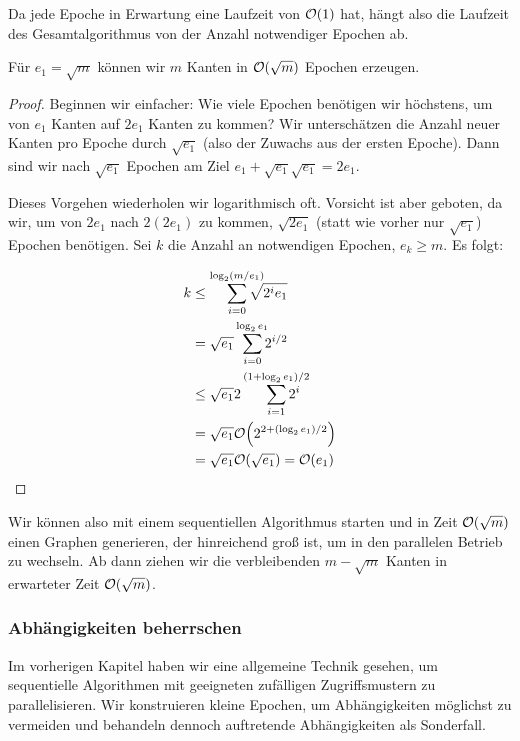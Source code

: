Da jede Epoche in Erwartung eine Laufzeit von $\mathcal{O}\!\left(1\right)$ hat, hängt also die Laufzeit des Gesamtalgorithmus von der Anzahl notwendiger Epochen ab.

\begin{lemma}
    Für $e_1 = \sqrt{m}$ können wir $m$ Kanten in $\mathcal{O}\!\left(\sqrt{m}\right)$ Epochen erzeugen.
\end{lemma}

\begin{proof}
    Beginnen wir einfacher: Wie viele Epochen benötigen wir höchstens, um von $e_1$ Kanten auf $2e_1$ Kanten zu kommen?
    Wir unterschätzen die Anzahl neuer Kanten pro Epoche durch $\sqrt{e_1}$ (also der Zuwachs aus der ersten Epoche).
    Dann sind wir nach $\sqrt{e_1}$ Epochen am Ziel $e_1 + \sqrt{e_1} \sqrt{e_1} = 2 e_1$.

    Dieses Vorgehen wiederholen wir logarithmisch oft.
    Vorsicht ist aber geboten, da wir, um von $2e_1$ nach $2(2e_1)$ zu kommen, $\sqrt{2 e_1}$ (statt wie vorher nur $\sqrt{e_1}$) Epochen benötigen.
    Sei $k$ die Anzahl an notwendigen Epochen, \dh $e_k \ge m$.
    Es folgt:

    \begin{align}
        k & \le \smashoperator[r]{\sum_{i=0}^{\ld(m/e_1)}} \sqrt{2^i e_1}      \\
          & = \sqrt{e_1} \smashoperator[r]{\sum_{i=0}^{\ld e_1}} 2^{i/2}       \\
          & \le \sqrt{e_1} 2 \smashoperator[r]{\sum_{i=1}^{(1+\ld e_1)/2}} 2^i \\
          & = \sqrt{e_1} \Oh{2^{2 + (\ld e_1) / 2}}         \\
          & = \sqrt{e_1} \Oh{\sqrt{e_1}} = \Oh{e_1}
    \end{align}
\end{proof}

Wir können also mit einem sequentiellen Algorithmus starten und in Zeit $\mathcal{O}\!\left(\sqrt m\right)$ einen Graphen generieren, der hinreichend groß ist, um in den parallelen Betrieb zu wechseln.
Ab dann ziehen wir die verbleibenden $m - \sqrt{m}$ Kanten in erwarteter Zeit $\mathcal{O}\!\left(\sqrt m\right)$.

\subsubsection{Abhängigkeiten beherrschen}\label{subsec:ba_sanders}
Im vorherigen Kapitel haben wir eine allgemeine Technik gesehen, um sequentielle Algorithmen mit geeigneten zufälligen Zugriffsmustern zu parallelisieren.
Wir konstruieren kleine Epochen, um Abhängigkeiten möglichst zu vermeiden und behandeln dennoch auftretende Abhängigkeiten als Sonderfall.


